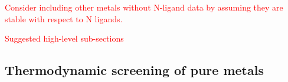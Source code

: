 \documentclass[journal=jacsat,manuscript=article]{achemso}
\begin{document}
\textcolor{red}{Consider including other metals without N-ligand data by assuming they are stable with respect to N ligands.}


\textcolor{red}{Suggested high-level sub-sections}
\subsection{Thermodynamic screening of pure metals}


\end{document}
